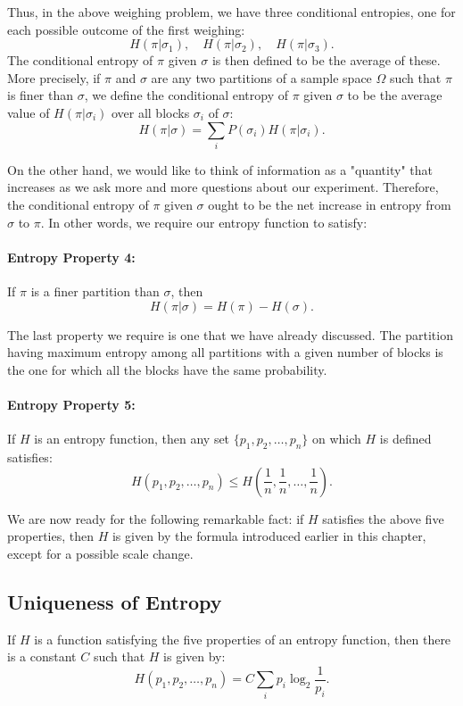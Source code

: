 \documentclass{report}
\begin{document}
Thus, in the above weighing problem, we have three conditional entropies, one for each possible outcome of the first weighing:
\[
H(\pi|\sigma_1), \quad H(\pi|\sigma_2), \quad H(\pi|\sigma_3).
\]
The conditional entropy of \( \pi \) given \( \sigma \) is then defined to be the average of these. More precisely, if \( \pi \) and \( \sigma \) are any two partitions of a sample space \( \Omega \) such that \( \pi \) is finer than \( \sigma \), we define the conditional entropy of \( \pi \) given \( \sigma \) to be the average value of \( H(\pi|\sigma_i) \) over all blocks \( \sigma_i \) of \( \sigma \):
\[
H(\pi|\sigma) = \sum_i P(\sigma_i) H(\pi|\sigma_i).
\]

On the other hand, we would like to think of information as a "quantity" that increases as we ask more and more questions about our experiment. Therefore, the conditional entropy of \( \pi \) given \( \sigma \) ought to be the net increase in entropy from \( \sigma \) to \( \pi \). In other words, we require our entropy function to satisfy:

\paragraph{Entropy Property 4:} 
If \( \pi \) is a finer partition than \( \sigma \), then
\[
H(\pi|\sigma) = H(\pi) - H(\sigma).
\]

The last property we require is one that we have already discussed. The partition having maximum entropy among all partitions with a given number of blocks is the one for which all the blocks have the same probability.

\paragraph{Entropy Property 5:} 
If \( H \) is an entropy function, then any set \( \{p_1, p_2, \ldots, p_n\} \) on which \( H \) is defined satisfies:
\[
H(p_1, p_2, \ldots, p_n) \leq H\left(\frac{1}{n}, \frac{1}{n}, \ldots, \frac{1}{n}\right).
\]

We are now ready for the following remarkable fact: if \( H \) satisfies the above five properties, then \( H \) is given by the formula introduced earlier in this chapter, except for a possible scale change.

\subsection*{Uniqueness of Entropy}
If \( H \) is a function satisfying the five properties of an entropy function, then there is a constant \( C \) such that \( H \) is given by:
\[
H(p_1, p_2, \ldots, p_n) = C \sum_{i} p_i \log_2 \frac{1}{p_i}.
\]
\end{document}

